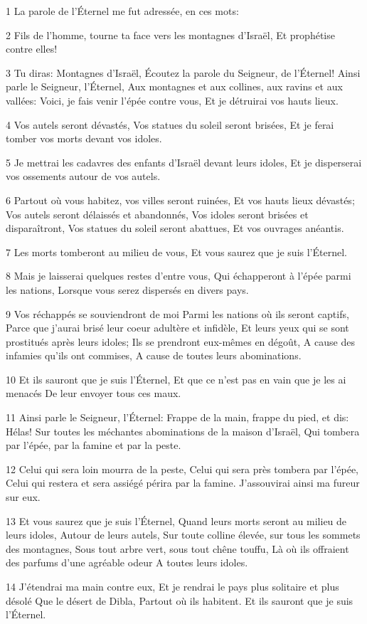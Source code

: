 \par 1 La parole de l'Éternel me fut adressée, en ces mots:
\par 2 Fils de l'homme, tourne ta face vers les montagnes d'Israël, Et prophétise contre elles!
\par 3 Tu diras: Montagnes d'Israël, Écoutez la parole du Seigneur, de l'Éternel! Ainsi parle le Seigneur, l'Éternel, Aux montagnes et aux collines, aux ravins et aux vallées: Voici, je fais venir l'épée contre vous, Et je détruirai vos hauts lieux.
\par 4 Vos autels seront dévastés, Vos statues du soleil seront brisées, Et je ferai tomber vos morts devant vos idoles.
\par 5 Je mettrai les cadavres des enfants d'Israël devant leurs idoles, Et je disperserai vos ossements autour de vos autels.
\par 6 Partout où vous habitez, vos villes seront ruinées, Et vos hauts lieux dévastés; Vos autels seront délaissés et abandonnés, Vos idoles seront brisées et disparaîtront, Vos statues du soleil seront abattues, Et vos ouvrages anéantis.
\par 7 Les morts tomberont au milieu de vous, Et vous saurez que je suis l'Éternel.
\par 8 Mais je laisserai quelques restes d'entre vous, Qui échapperont à l'épée parmi les nations, Lorsque vous serez dispersés en divers pays.
\par 9 Vos réchappés se souviendront de moi Parmi les nations où ils seront captifs, Parce que j'aurai brisé leur coeur adultère et infidèle, Et leurs yeux qui se sont prostitués après leurs idoles; Ils se prendront eux-mêmes en dégoût, A cause des infamies qu'ils ont commises, A cause de toutes leurs abominations.
\par 10 Et ils sauront que je suis l'Éternel, Et que ce n'est pas en vain que je les ai menacés De leur envoyer tous ces maux.
\par 11 Ainsi parle le Seigneur, l'Éternel: Frappe de la main, frappe du pied, et dis: Hélas! Sur toutes les méchantes abominations de la maison d'Israël, Qui tombera par l'épée, par la famine et par la peste.
\par 12 Celui qui sera loin mourra de la peste, Celui qui sera près tombera par l'épée, Celui qui restera et sera assiégé périra par la famine. J'assouvirai ainsi ma fureur sur eux.
\par 13 Et vous saurez que je suis l'Éternel, Quand leurs morts seront au milieu de leurs idoles, Autour de leurs autels, Sur toute colline élevée, sur tous les sommets des montagnes, Sous tout arbre vert, sous tout chêne touffu, Là où ils offraient des parfums d'une agréable odeur A toutes leurs idoles.
\par 14 J'étendrai ma main contre eux, Et je rendrai le pays plus solitaire et plus désolé Que le désert de Dibla, Partout où ils habitent. Et ils sauront que je suis l'Éternel.

